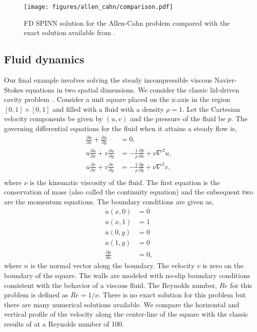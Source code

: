 \documentclass[12pt]{article}
\begin{document}
\begin{figure}
\centering
\texttt{[image: figures/allen\_cahn/comparison.pdf]}
\caption{FD SPINN solution for the Allen-Cahn problem compared with the exact solution available from \cite{RPK2019}.}
\label{fig:spinn_allen_cahn}
\end{figure}

\subsection{Fluid dynamics}
\label{subsec:ns}

Our final example involves solving the steady incompressible viscous Navier-Stokes equations in two spatial dimensions. We consider the classic lid-driven cavity problem~\cite{ldc:ghia}. Consider a unit square placed on the x-axis in the region $[0, 1] \times [0, 1]$ and filled with a fluid with a density $\rho=1$.   Let the Cartesian velocity components be given by $(u, v)$ and the pressure of the fluid be $p$.  The governing differential equations for the fluid when it attains a steady flow is,
\begin{displaymath}
\begin{split}
\frac{\partial u}{\partial x} + \frac{\partial u}{\partial y} &= 0, \\
u \frac{\partial u}{\partial x} + v \frac{\partial u}{\partial y} &= -\frac{1}{\rho} \frac{\partial p}{\partial x} + \nu \nabla^2 u,\\
u \frac{\partial v}{\partial x} + v \frac{\partial v}{\partial y} &= -\frac{1}{\rho} \frac{\partial p}{\partial y} + \nu \nabla^2 v,\\
\end{split}
\end{displaymath}
where $\nu$ is the kinematic viscosity of the fluid.  The first equation is the conservation of mass (also called the continuity equation) and the subsequent two are the momentum equations. The boundary conditions are given as,
\begin{displaymath}
\begin{split}
    u(x, 0) &= 0\\
    u(x, 1) &= 1\\
    u(0, y) &= 0 \\
    u(1, y) &= 0 \\
    \frac{\partial p}{\partial n} &= 0,
\end{split}
\end{displaymath}
where $n$ is the normal vector along the boundary. The velocity $v$ is zero on the boundary of the square. The walls are modeled with no-slip boundary conditions consistent with the behavior of a viscous fluid. The Reynolds number, $Re$ for this problem is defined as $Re = 1/\nu$. There is no exact solution for this problem but there are many numerical solutions available.  We compare the horizontal and vertical profile of the velocity along the center-line of the square with the classic results of \cite{ldc:ghia} at a Reynolds number of 100.
\end{document}
